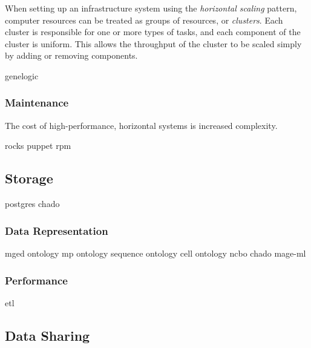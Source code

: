 When setting up an infrastructure system using the \emph{horizontal scaling}
pattern, computer resources can be treated as groups of resources, or
\emph{clusters}.  Each cluster is responsible for one or more types of tasks,
and each component of the cluster is uniform.  This allows the throughput of
the cluster to be scaled simply by adding or removing components.

genelogic		\cite{PMID_17059591}

\subsubsection{Maintenance}

The cost of high-performance, horizontal systems is increased complexity.

rocks		\cite{papadopoulos2003}
puppet		\cite{puppet}
rpm		\cite{bailey1997}

\subsection{Storage}

postgres	\cite{postgresql}
chado		\cite{PMID_17646315}

\subsubsection{Data Representation}

mged ontology		\cite{PMID_16428806}
mp ontology		\cite{PMID_15642099}
sequence ontology	\cite{PMID_15892872}
cell ontology		\cite{PMID_15693950}
ncbo			\cite{PMID_16901225}
chado			\cite{PMID_17646315}
mage-ml			\cite{PMID_12225585}

\subsubsection{Performance}
etl			\cite{kimball2004}
\subsection{Data Sharing}

